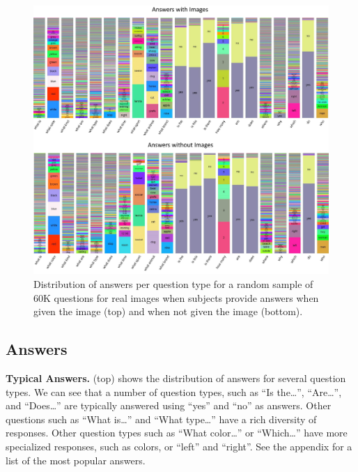 \begin{figure}
\centering
\includegraphics[width=1\linewidth]{figures/answers.pdf}
\caption{Distribution of answers per question type for a random sample of 60K questions for real images when subjects provide answers when given the image (top) and when not given the image (bottom).}
\label{fig:AnsPerQues}
\end{figure}


\subsection{Answers}

\textbf{Typical Answers.}
 (top) shows the distribution of answers for several question types.
We can see that a number of question types, such as ``Is the\ldots'', ``Are\ldots'', and ``Does\ldots'' are
typically answered using ``yes'' and ``no'' as answers.
Other questions such as ``What is\ldots'' and ``What type\ldots'' have a rich diversity
of responses. Other question types such as ``What color\ldots'' or ``Which\ldots'' have more specialized responses,
such as colors, or ``left'' and ``right''. 
See the appendix for a list of the most popular answers.

